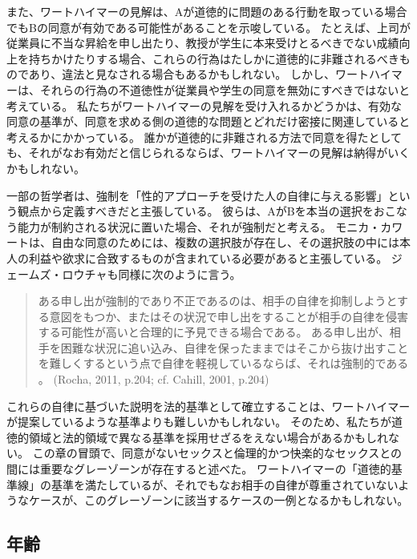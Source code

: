 \documentclass[paper=a4,book,openany]{jlreq} \usepackage{mystyle}
\begin{document}
また、ワートハイマーの見解は、Aが道徳的に問題のある行動を取っている場合でもBの同意が有効である可能性があることを示唆している。
たとえば、上司が従業員に不当な昇給を申し出たり、教授が学生に本来受けとるべきでない成績向上を持ちかけたりする場合、これらの行為はたしかに道徳的に非難されるべきものであり、違法と見なされる場合もあるかもしれない。
しかし、ワートハイマーは、それらの行為の不道徳性が従業員や学生の同意を無効にすべきではないと考えている。
私たちがワートハイマーの見解を受け入れるかどうかは、有効な同意の基準が、同意を求める側の道徳的な問題とどれだけ密接に関連していると考えるかにかかっている。
誰かが道徳的に非難される方法で同意を得たとしても、それがなお有効だと信じられるならば、ワートハイマーの見解は納得がいくかもしれない。

一部の哲学者は、強制を「性的アプローチを受けた人の自律に与える影響」という観点から定義すべきだと主張している。
彼らは、AがBを本当の選択をおこなう能力が制約される状況に置いた場合、それが強制だと考える。
モニカ・カワートは、自由な同意のためには、複数の選択肢が存在し、その選択肢の中には本人の利益や欲求に合致するものが含まれている必要があると主張している\citep{cowart04:_under_acts_consen}。
ジェームズ・ロウチャも同様に次のように言う。

\begin{quote}
ある申し出が強制的であり不正であるのは、相手の自律を抑制しようとする意図をもつか、またはその状況で申し出をすることが相手の自律を侵害する可能性が高いと合理的に予見できる場合である。
ある申し出が、相手を困難な状況に追い込み、自律を保ったままではそこから抜け出すことを難しくするという点で自律を軽視しているならば、それは強制的である  \nocite{rocha11:_sexual_haras_coerc_offer} \nocite{cahill01:_rethin_rape}。
(Rocha, 2011, p.204; cf. Cahill, 2001, p.204)

\end{quote}

これらの自律に基づいた説明を法的基準として確立することは、ワートハイマーが提案しているような基準よりも難しいかもしれない。
そのため、私たちが道徳的領域と法的領域で異なる基準を採用せざるをえない場合があるかもしれない。
この章の冒頭で、同意がないセックスと倫理的かつ快楽的なセックスとの間には重要なグレーゾーンが存在すると述べた。
ワートハイマーの「道徳的基準線」の基準を満たしているが、それでもなお相手の自律が尊重されていないようなケースが、このグレーゾーンに該当するケースの一例となるかもしれない。

\subsection{年齢}
\end{document}
